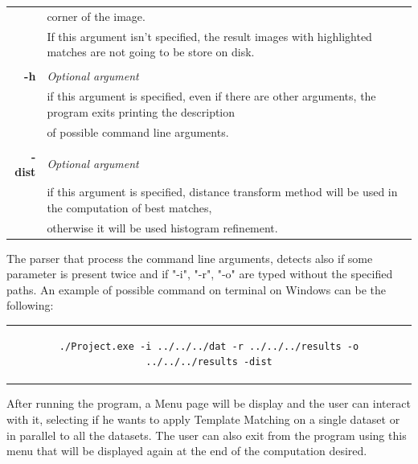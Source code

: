 \documentclass{article}
\begin{document}
\begin{table}[H]
\begin{tabular}{rl}
&{corner of the image.} \\
& {If this argument isn't specified, the result images with highlighted matches are not going to be store on disk.}\\
&\\
\textbf{-h} & {\textit{Optional argument}}\\
& {if this argument is specified, even if there are other arguments, the program exits printing the description}\\
&{of possible command line arguments.}\\
&\\
\textbf{-dist} & {\textit{Optional argument}}\\
& {if this argument is specified, distance transform method will be used in the computation of best matches,}\\
&{otherwise it will be used histogram refinement.}\\
\end{tabular}
\end{table}
The parser that process the command line arguments, detects also if some parameter is present twice and if "-i", "-r", "-o" are typed without the specified paths. An example of possible command on terminal on Windows can be the following:
\begin{center}
\begin{tabular}{c}
\begin{lstlisting}[linewidth=390pt, basicstyle=\footnotesize\sffamily,]
./Project.exe -i ../../../dat -r ../../../results -o ../../../results -dist
\end{lstlisting}
\end{tabular}
\end{center}
After running the program, a Menu page will be display and the user can interact with it, selecting if he wants to apply Template Matching on a single dataset or in parallel to all the datasets. The user can also exit from the program using this menu that will be displayed again at the end of the computation desired.
\end{document}
